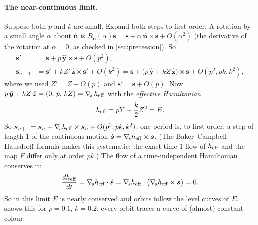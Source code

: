 \documentclass[11pt,a4paper]{article}
\newcommand{\vs}{\bm{s}}
\begin{document}
\paragraph{The near-continuous limit.} Suppose both $p$ and $k$ are small. Expand both steps to first order. A
rotation by a small angle $\alpha$ about $\hat{\bm n}$ is $R_{\hat{\bm n}}(\alpha)\vs = \vs + \alpha\,\hat{\bm n}
\times\vs + O(\alpha^2)$ (the derivative of the rotation at $\alpha = 0$, as checked in \cref{sec:precession}).
So
\begin{align*}
  \vs' &= \vs + p\,\hat{\bm y}\times\vs + O(p^2), \\
  \vs_{n+1} &= \vs' + kZ'\,\hat{\bm z}\times\vs' + O(k^2) = \vs + \big(p\,\hat{\bm y} + kZ\,\hat{\bm z}\big)\times\vs
  + O(p^2, pk, k^2),
\end{align*}
where we used $Z' = Z + O(p)$ and $\vs' = \vs + O(p)$. Now $p\,\hat{\bm y} + kZ\,\hat{\bm z} = (0,\, p,\, kZ) =
\nabla_{\!s}\,h_{\rm eff}$ with the \emph{effective Hamiltonian}
\begin{equation}\label{eq:heff}
  h_{\rm eff} = pY + \frac{k}{2}Z^2 = E .
\end{equation}
So $\vs_{n+1} = \vs_n + \nabla_{\!s} h_{\rm eff}\times\vs_n + O(p^2, pk, k^2)$: one period is, to first order, a step
of length $1$ of the continuous motion $\dot{\vs} = \nabla_{\!s} h_{\rm eff}\times\vs$. (The Baker--Campbell--Hausdorff
formula makes this systematic: the exact time-$1$ flow of $h_{\rm eff}$ and the map $F$ differ only at order $pk$.)
The flow of a time-independent Hamiltonian conserves it:
\begin{equation*}
  \frac{d h_{\rm eff}}{dt} = \nabla_{\!s} h_{\rm eff}\cdot\dot{\vs} = \nabla_{\!s} h_{\rm eff}\cdot\big(\nabla_{\!s}
  h_{\rm eff}\times\vs\big) = 0 .
\end{equation*}
So in this limit $E$ is nearly conserved and orbits follow the level curves of $E$.  shows this
for $p = 0.1$, $k = 0.2$: every orbit traces a curve of (almost) constant colour.
\end{document}
